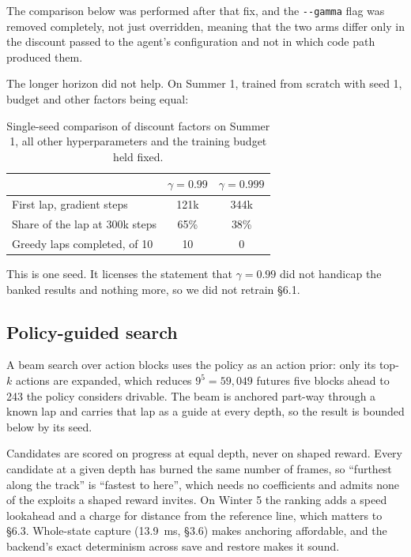 \documentclass[11pt]{article}
\begin{document}
The comparison below was performed after that fix, and the \texttt{-{}-gamma} flag was removed completely, not just overridden, meaning that the two arms differ only in the discount passed to the agent's configuration and not in which code path produced them.

The longer horizon did not help. On Summer 1, trained from scratch with seed 1, budget and other factors being equal:

\begin{table}[h]
\centering
\begin{tabular}{@{}lcc@{}}
\toprule
 & $\gamma = 0.99$ & $\gamma = 0.999$ \\
\midrule
First lap, gradient steps & 121k & 344k \\
Share of the lap at 300k steps & 65\% & 38\% \\
Greedy laps completed, of 10 & 10 & 0 \\
\bottomrule
\end{tabular}
\caption{Single-seed comparison of discount factors on Summer 1, all other hyperparameters and the training budget held fixed.}
\label{tab:gammacompare}
\end{table}

This is one seed. It licenses the statement that $\gamma = 0.99$ did not handicap the banked results and nothing more, so we did not retrain \S6.1.

\subsection{Policy-guided search}

A beam search over action blocks uses the policy as an action prior: only its top-$k$ actions are expanded, which reduces $9^5 = 59{,}049$ futures five blocks ahead to 243 the policy considers drivable. The beam is anchored part-way through a known lap and carries that lap as a guide at every depth, so the result is bounded below by its seed.

Candidates are scored on progress at equal depth, never on shaped reward. Every candidate at a given depth has burned the same number of frames, so ``furthest along the track'' is ``fastest to here'', which needs no coefficients and admits none of the exploits a shaped reward invites. On Winter 5 the ranking adds a speed lookahead and a charge for distance from the reference line, which matters to \S6.3. Whole-state capture (13.9~ms, \S3.6) makes anchoring affordable, and the backend's exact determinism across save and restore makes it sound.
\end{document}
